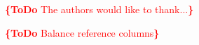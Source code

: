 \documentclass[conference]{IEEEtran}
\newcommand{\todo}[1]{\noindent\textcolor{red}{{\bf \{ToDo} #1{\bf \}}}}
\begin{document}
\todo{The authors would like to thank...}

\todo{Balance reference columns}







\end{document}
